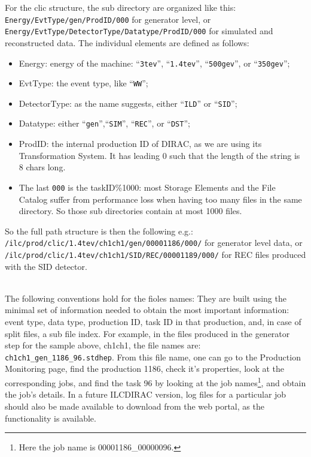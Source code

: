 \documentclass[11pt,a4paper]{scrartcl}
\begin{document}
For the clic structure, the sub directory are organized like this:\\
\lstinline[language=bash]|Energy/EvtType/gen/ProdID/000| for generator level,
or\\
\lstinline[language=bash]|Energy/EvtType/DetectorType/Datatype/ProdID/000|
for simulated and reconstructed data. The individual elements are defined as follows:
\begin{itemize}
  \item Energy: energy of the machine: ``\lstinline|3tev|'',
  ``\lstinline|1.4tev|'', ``\lstinline|500gev|'', or ``\lstinline|350gev|'';
  \item EvtType: the event type, like ``\lstinline|WW|'';
  \item DetectorType: as the name suggests, either ``\lstinline|ILD|'' or
  ``\lstinline|SID|'';
  \item Datatype: either ``\lstinline|gen|'',``\lstinline|SIM|'',
  ``\lstinline|REC|'', or ``\lstinline|DST|'';
  \item ProdID: the internal production ID of DIRAC, as we are using its
  Transformation System. It has leading 0 such that the length of the string is
  8 chars long.
  \item The last \lstinline|000| is the taskID\%1000: most Storage Elements and
  the File Catalog suffer from performance loss when having too many files in the same
  directory. So those sub directories contain at most 1000 files.
\end{itemize}

So the full path structure is then the following e.g.:\\
\lstinline[language=bash]|/ilc/prod/clic/1.4tev/ch1ch1/gen/00001186/000/| for
generator level data, or \\
\lstinline[language=bash]|/ilc/prod/clic/1.4tev/ch1ch1/SID/REC/00001189/000/|
for REC files produced with the SID detector.

~\\

The following conventions hold for the fioles names: They are built using the
minimal set of information needed to obtain the most important information: event type,
data type, production ID, task ID in that production, and, in case of split
files, a sub file index. For example, in the files produced in the generator
step for the sample above, ch1ch1, the file names are:
\lstinline[language=bash]|ch1ch1_gen_1186_96.stdhep|.  From this file name,
one can go to the Production Monitoring page, find the production 1186, check
it's properties, look at  the corresponding jobs, and find the task 96 by
looking at the job names\footnote{Here the job name is 00001186\_00000096.},
and obtain the job's details. In a future ILCDIRAC version, log files for a
particular job should also be made available to download from the web portal, as
the functionality is available.
\end{document}
